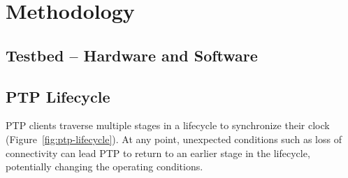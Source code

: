 
\section{Methodology}

\subsection{Testbed -- Hardware and Software}

\subsection{PTP Lifecycle}


\begin{figure*}
    \newcommand{\intervalAnnotation}[4]{
        \draw[Bar-Bar] ([yshift=#3, xshift=-0.1cm]#1.south west) -- ([yshift=#3, xshift=0.1cm]#2.south east) node[midway, below] {#4};
    }
    \newcommand{\intervalAnnotationAbove}[4]{
            \draw[Bar-Bar] ([yshift=#3, xshift=-0.1cm]#1.north west) -- ([yshift=#3, xshift=0.1cm]#2.north east) node[midway, above] {#4};
    }

    \caption{Different stages in the PTP lifecycle that a PTP slave traverses while synchronizing its clock. }
    \label{fig:ptp-lifecycle}
\end{figure*}

PTP clients traverse multiple stages in a lifecycle to synchronize their clock (Figure~\ref{fig:ptp-lifecycle}). At any point, unexpected conditions such as loss of connectivity can lead PTP to return to an earlier stage in the lifecycle, potentially changing the operating conditions.

